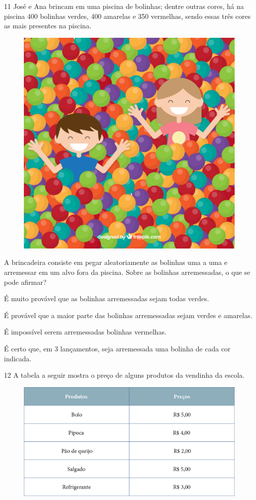 \pagebreak
\num{11} José e Ana brincam em uma piscina de bolinhas; dentre outras cores, há
na piscina 400 bolinhas verdes, 400 amarelas e 350 vermelhas, sendo
essas três cores as mais presentes na piscina.

\begin{figure}[htpb!]
\centering
\includegraphics[width=.7\textwidth]{./media/image147.png}
\end{figure}

A brincadeira consiste em pegar aleatoriamente as bolinhas uma a uma e
arremessar em um alvo fora da piscina. Sobre as bolinhas arremessadas, o que se pode afirmar?

\begin{escolha}
\item É muito provável que as bolinhas arremessadas sejam todas verdes.

\item É provável que a maior parte das bolinhas arremessadas sejam verdes e amarelas.

\item É impossível serem arremessadas bolinhas vermelhas.

\item É certo que, em 3 lançamentos, seja arremessada uma bolinha de cada cor indicada.
\end{escolha}

\pagebreak
\num{12} A tabela a seguir mostra o preço de alguns produtos da vendinha da escola.

\begin{figure}[htpb!]
\includegraphics[width=\textwidth]{./media/image148.png}
\end{figure}

